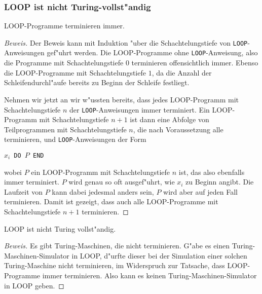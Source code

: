 \subsubsection{LOOP ist nicht Turing-vollst"andig}
\begin{satz}
LOOP-Programme terminieren immer.
\end{satz}

\begin{proof}[Beweis]
Der Beweis kann mit Induktion "uber die Schachtelungstiefe
von {\tt LOOP}-Anweisungen gef"uhrt werden. Die LOOP-Programme
ohne {\tt LOOP}-Anweisung, also die Programme mit Schachtelungstiefe
$0$ terminieren offensichtlich immer. Ebenso die LOOP-Programme
mit Schachtelungstiefe $1$, da die Anzahl der Schleifendurchl"aufe
bereits zu Beginn der Schleife festliegt.

Nehmen wir jetzt an wir w"ussten bereits, dass jedes LOOP-Programm mit
Schachtelungstiefe $n$ der {\tt LOOP}-Anweisungen immer terminiert.
Ein LOOP-Programm mit Schachtelungstiefe $n+1$ ist dann eine
Abfolge von Teilprogrammen mit Schachtelungstiefe $n$, die nach
Voraussetzung alle terminieren, und {\tt LOOP}-Anweisungen der
Form
\begin{algorithmic}
$x_i${\tt\ DO }$P${\tt\ END}
\end{algorithmic}
wobei $P$ ein LOOP-Programm mit Schachtelungstiefe $n$ ist, das also
ebenfalls immer terminiert. $P$ wird genau so oft ausgef"uhrt, wie
$x_i$ zu Beginn angibt. Die Laufzeit von $P$ kann dabei jedesmal
anders sein, $P$ wird aber auf jeden Fall terminieren. Damit ist
gezeigt, dass auch alle LOOP-Programme mit Schachtelungstiefe $n+1$
terminieren.
\end{proof}

\begin{satz}
LOOP ist nicht Turing vollst"andig.
\end{satz}

\begin{proof}[Beweis]
Es gibt Turing-Maschinen, die nicht terminieren. G"abe es einen
Turing-Maschinen-Simulator in LOOP, d"urfte dieser bei der
Simulation einer solchen Turing-Maschine nicht terminieren, im
Widerspruch zur Tatsache, dass LOOP-Programme immer terminieren.
Also kann es keinen Turing-Maschinen-Simulator in LOOP geben.
\end{proof}


